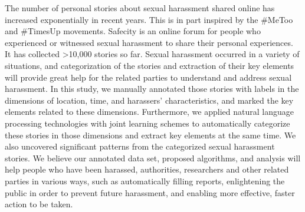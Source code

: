 The number of personal stories about sexual harassment shared online has increased exponentially in recent years. This is in part inspired by the \#MeToo and \#TimesUp movements. Safecity is an online forum for people who experienced or witnessed sexual harassment to share their personal experiences. It has collected >10,000 stories so far. Sexual harassment occurred in a variety of situations, and categorization of the stories and extraction of their key elements will provide great help for the related parties to understand and address sexual harassment. In this study, we manually annotated those stories with labels in the dimensions of location, time, and harassers' characteristics, and marked the key elements related to these dimensions. Furthermore, we applied natural language processing technologies with joint learning schemes to automatically categorize these stories in those dimensions and extract key elements at the same time. We also uncovered significant patterns from the categorized sexual harassment stories. We believe our annotated data set, proposed algorithms, and analysis will help people who have been harassed, authorities, researchers and other related parties in various ways, such as automatically filling reports, enlightening the public in order to prevent future harassment, and enabling more effective, faster action to be taken.